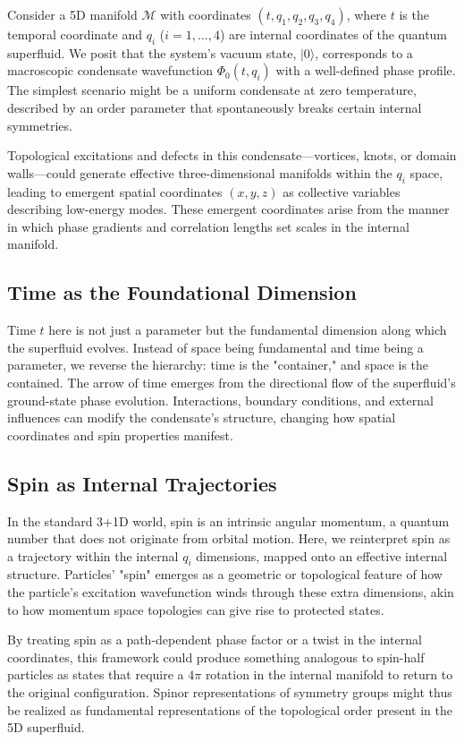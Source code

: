 \documentclass[aps,prd,twocolumn,showpacs,showkeys,superscriptaddress,amsmath,amssymb]{revtex4-2}
\begin{document}
Consider a 5D manifold $\mathcal{M}$ with coordinates $(t, q_1, q_2, q_3, q_4)$, where $t$ is the temporal coordinate and $q_i$ ($i=1,\ldots,4$) are internal coordinates of the quantum superfluid. We posit that the system's vacuum state, $|0\rangle$, corresponds to a macroscopic condensate wavefunction $\Phi_0(t, q_i)$ with a well-defined phase profile. The simplest scenario might be a uniform condensate at zero temperature, described by an order parameter that spontaneously breaks certain internal symmetries.

Topological excitations and defects in this condensate—vortices, knots, or domain walls—could generate effective three-dimensional manifolds within the $q_i$ space, leading to emergent spatial coordinates $(x,y,z)$ as collective variables describing low-energy modes. These emergent coordinates arise from the manner in which phase gradients and correlation lengths set scales in the internal manifold.

\subsection{Time as the Foundational Dimension}

Time $t$ here is not just a parameter but the fundamental dimension along which the superfluid evolves. Instead of space being fundamental and time being a parameter, we reverse the hierarchy: time is the "container," and space is the contained. The arrow of time emerges from the directional flow of the superfluid's ground-state phase evolution. Interactions, boundary conditions, and external influences can modify the condensate's structure, changing how spatial coordinates and spin properties manifest.

\subsection{Spin as Internal Trajectories}

In the standard 3+1D world, spin is an intrinsic angular momentum, a quantum number that does not originate from orbital motion. Here, we reinterpret spin as a trajectory within the internal $q_i$ dimensions, mapped onto an effective internal structure. Particles' "spin" emerges as a geometric or topological feature of how the particle's excitation wavefunction winds through these extra dimensions, akin to how momentum space topologies can give rise to protected states.

By treating spin as a path-dependent phase factor or a twist in the internal coordinates, this framework could produce something analogous to spin-half particles as states that require a $4\pi$ rotation in the internal manifold to return to the original configuration. Spinor representations of symmetry groups might thus be realized as fundamental representations of the topological order present in the 5D superfluid.
\end{document}
